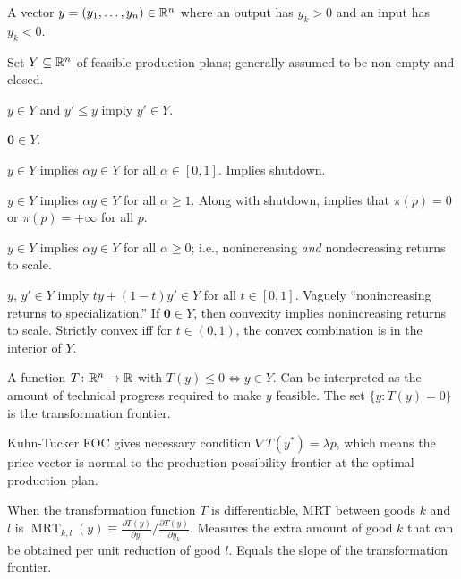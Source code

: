\documentclass[8pt,letterpaper, landscape]{extarticle} %
\newcommand{\mzero}{\ensuremath{\mathbf{0}}}
\begin{document}
\begin{multicols}{3}
\begin{description}
 A vector $ y = (y_1, \dotsc , y_n) \in \mathbb{R}^n $ where an output has $ y_k > 0 $ and an input has $ y_k < 0 $.

 Set $ Y \subseteq \mathbb{R}^n $ of feasible production plans; generally assumed to be non-empty and closed.

 $ y \in Y $ and $ y' \leq y $ imply $ y' \in Y $.

 $ \mzero \in Y $.

 $ y \in Y $ implies $ \alpha y \in Y $ for all $ \alpha \in [0,1] $. Implies shutdown.

 $ y \in Y $ implies $ \alpha y \in Y $ for all $ \alpha \geq 1 $. Along with shutdown, implies that $ \pi(p) = 0 $ or $ \pi(p) = + \infty $ for all $ p $.

 $ y \in Y $ implies $ \alpha y \in Y $ for all $ \alpha \geq 0 $; i.e., nonincreasing \textit{and} nondecreasing returns to scale.

 $ y $, $ y' \in Y $ imply $ ty + (1-t)y' \in Y $ for all $ t \in [0,1] $. Vaguely ``nonincreasing returns to specialization.'' If $ \mzero \in Y $, then convexity implies nonincreasing returns to scale. Strictly convex iff for $ t \in (0,1) $, the convex combination is in the interior of $ Y $.

 A function $ T \colon \mathbb{R}^n \to \mathbb{R} $ with $ T(y) \leq 0 \iff y \in Y $. Can be interpreted as the amount of technical progress required to make $ y $ feasible. The set $ \{ y \colon T(y) = 0 \} $ is the transformation frontier.

Kuhn-Tucker FOC gives necessary condition $ \nabla T( y^* ) = \lambda p $, which means the price vector is normal to the production possibility frontier at the optimal production plan.

 When the transformation function $ T $ is differentiable, MRT between goods $ k $ and $ l $ is $ \operatorname{MRT}_{k,l}(y) \equiv \frac{\partial T(y)}{\partial y_l} / \frac{\partial T(y)}{\partial y_k} $. Measures the extra amount of good $ k $ that can be obtained per unit reduction of good $ l $. Equals the slope of the transformation frontier.


\end{description}
\end{multicols}
\end{document}
